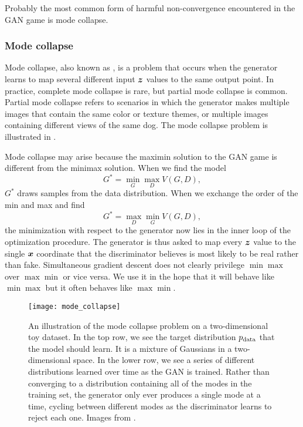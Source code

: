 Probably the most common form of harmful non-convergence encountered in the GAN
game is mode collapse.

\subsubsection{Mode collapse}
\label{sec:mode_collapse}

Mode collapse, also known as , is a problem that occurs
when the generator learns to map several different input ${\bm{z}}$ values to the same output
point.
In practice, complete mode collapse is rare, but partial mode collapse is common.
Partial mode collapse refers to scenarios in which the
generator makes multiple images that contain the same color or texture themes,
or multiple images containing different views of the same dog.
The mode collapse problem is illustrated in .

Mode collapse may arise because the maximin solution to the GAN game is different
from the minimax solution.
When we find the model
\[ G^* = \min_G \max_D V(G,D), \]
$G^*$ draws samples from the data distribution.
When we exchange the order of the min and max and find
\[ G^* = \max_D \min_G V(G, D), \]
the minimization with respect to the generator now lies in the inner
loop of the optimization procedure.
The generator is thus asked to map every ${\bm{z}}$ value to the single ${\bm{x}}$
coordinate that the discriminator believes is most likely to be real rather than fake.
Simultaneous gradient descent does not clearly privilege $\min \max$ over $\max \min$
or vice versa. We use it in the hope that it will behave like $\min \max$ but it
often behaves like $\max \min$.


\begin{figure}
\centering
\texttt{[image: mode\_collapse]}
\caption{
An illustration of the mode collapse problem on a two-dimensional toy dataset.
In the top row, we see the target distribution $p_{\rm{data}}$ that the model should
learn. It is a mixture of Gaussians in a two-dimensional space.
In the lower row, we see a series of different distributions learned over time
as the GAN is trained.
Rather than converging to a distribution containing all of the modes in the
training set, the generator only ever produces a single mode at a time, cycling
between different modes as the discriminator learns to reject each one.
Images from \citet{metz2016unrolled}.
}
\label{fig:mode_collapse}
\end{figure}

